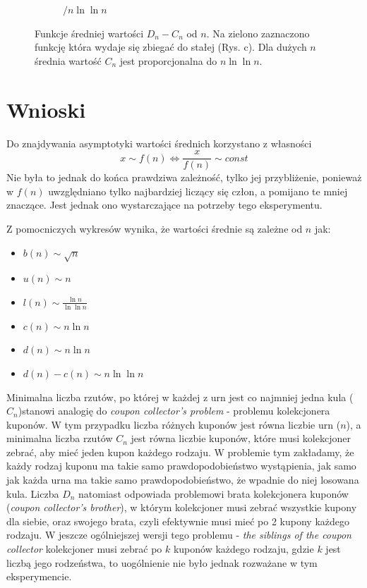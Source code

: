 \documentclass{article}
\begin{document}
\begin{figure}[h]
\begin{subfigure}{0.32\textwidth}
        \caption{$/ n \ln \ln n$}
    \end{subfigure}
    \caption{Funkcje średniej wartości $D_n-C_n$ od $n$. Na zielono zaznaczono funkcję która wydaje się zbiegać do stałej (Rys. c). Dla dużych $n$ średnia wartość $C_n$ jest proporcjonalna do $n\ln\ln n$.}
\end{figure}


\section{Wnioski}
Do znajdywania asymptotyki wartości średnich korzystano z własności
$$
    x \sim f(n) \iff \frac{x}{f(n)} \sim const
$$
Nie była to jednak do końca prawdziwa zależność, tylko jej przybliżenie, ponieważ w $f(n)$ uwzględniano tylko najbardziej liczący się człon, a pomijano te mniej znaczące. Jest jednak ono wystarczające na potrzeby tego eksperymentu.

Z pomocniczych wykresów wynika, że wartości średnie są zależne od $n$ jak:
\begin{itemize}
    \item $b(n) \sim \sqrt{n}$
    \item $u(n) \sim n$
    \item $l(n) \sim \frac{\ln n}{\ln \ln n}$
    \item $c(n) \sim n\ln n$
    \item $d(n) \sim n\ln n$
    \item $d(n)-c(n) \sim n\ln \ln n$
\end{itemize}

Minimalna liczba rzutów, po której w każdej z urn jest co najmniej jedna kula ($C_n$)stanowi analogię do \textit{coupon collector's problem} - problemu kolekcjonera kuponów. W tym przypadku liczba różnych kuponów jest równa liczbie urn ($n$), a minimalna liczba rzutów $C_n$ jest równa liczbie kuponów, które musi kolekcjoner zebrać, aby mieć jeden kupon każdego rodzaju. W problemie tym zakładamy, że każdy rodzaj kuponu ma takie samo prawdopodobieństwo wystąpienia, jak samo jak każda urna ma takie samo prawdopodobieństwo, że wpadnie do niej losowana kula. Liczba $D_n$ natomiast odpowiada problemowi brata kolekcjonera kuponów (\textit{coupon collector's brother}), w którym kolekcjoner musi zebrać wszystkie kupony dla siebie, oraz swojego brata, czyli efektywnie musi mieć po 2 kupony każdego rodzaju. W jeszcze ogólniejszej wersji tego problemu - \textit{the siblings of the coupon collector} kolekcjoner musi zebrać po $k$ kuponów każdego rodzaju, gdzie $k$ jest liczbą jego rodzeństwa, to uogólnienie nie było jednak rozważane w tym eksperymencie.
\end{document}
